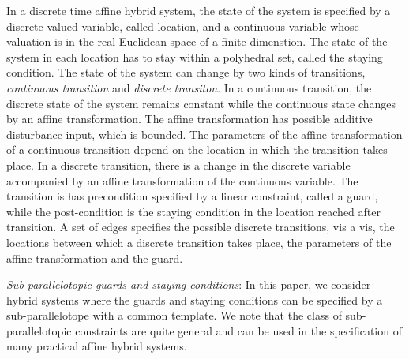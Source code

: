 In a discrete time affine hybrid system, the state of the system is
specified by a discrete valued variable, called location, and a
continuous variable whose valuation is in the real Euclidean space of
a finite dimenstion.  The state of the system in each location has to
stay within a polyhedral set, called the staying condition.  The state
of the system can change by two kinds of transitions, {\it continuous
  transition} and {\it discrete transiton}.  In a continuous
transition, the discrete state of the system remains constant while
the continuous state changes by an affine transformation.  The affine
transformation has possible additive disturbance input, which is
bounded.  The parameters of the affine transformation of a continuous
transition depend on the location in which the transition takes place.
In a discrete transition, there is a change in the discrete variable
accompanied by an affine transformation of the continuous variable.
The transition is has precondition specified by a linear constraint,
called a guard, while the post-condition is the staying condition in
the location reached after transition.  A set of edges specifies
the possible discrete transitions, vis a vis, the locations between
which a discrete transition takes place, the parameters of the affine
transformation and the guard.   

{\it Sub-parallelotopic guards and staying conditions}: In this paper,
we consider hybrid systems where the guards and staying conditions can
be specified by a sub-parallelotope with a common template.  We note
that the class of sub-parallelotopic constraints are quite general and
can be used in the specification of many practical affine hybrid
systems.  

